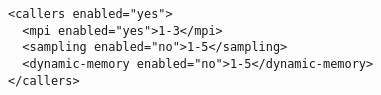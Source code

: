 \begin{verbatim}
<callers enabled="yes">
  <mpi enabled="yes">1-3</mpi>
  <sampling enabled="no">1-5</sampling>
  <dynamic-memory enabled="no">1-5</dynamic-memory>
</callers>
\end{verbatim}
